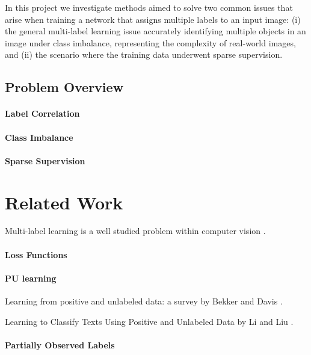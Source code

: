 \documentclass[lettersize,journal]{IEEEtran}
\begin{document}
In this project we investigate methods aimed to solve two common issues that arise when training a network that assigns multiple labels to an input image: (i) the general multi-label learning issue accurately identifying multiple objects in an image under class imbalance, representing the complexity of real-world images, and (ii) the scenario where the training data underwent sparse supervision.


\subsection{Problem Overview}

\paragraph{Label Correlation}
\paragraph{Class Imbalance}
\paragraph{Sparse Supervision}


\section{Related Work}
Multi-label learning is a well studied problem within computer vision \cite{mlsp}. 



\paragraph{Loss Functions}

\paragraph{PU learning} 
Learning from positive and unlabeled data: a survey by Bekker and Davis \cite{Bekker_2020}.

Learning to Classify Texts Using Positive and Unlabeled Data by Li and Liu \cite{Li_2003}.

\paragraph{Partially Observed Labels}
\end{document}
